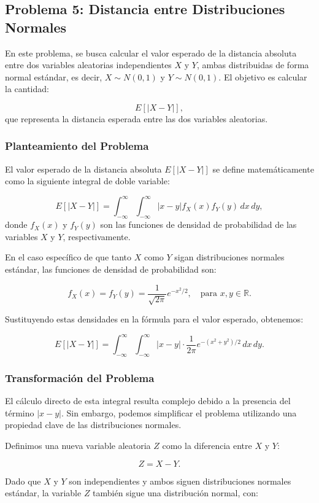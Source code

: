 \documentclass[12pt]{article}
\begin{document}
\subsection{Problema 5: Distancia entre Distribuciones Normales}

En este problema, se busca calcular el valor esperado de la distancia absoluta entre dos variables aleatorias independientes $X$ y $Y$, ambas distribuidas de forma normal estándar, es decir, $X \sim N(0, 1)$ y $Y \sim N(0, 1)$. El objetivo es calcular la cantidad:

\[
E[|X - Y|],
\]
que representa la distancia esperada entre las dos variables aleatorias.

\subsubsection{Planteamiento del Problema}
El valor esperado de la distancia absoluta $E[|X - Y|]$ se define matemáticamente como la siguiente integral de doble variable:

\[
E[|X - Y|] = \int_{-\infty}^\infty \int_{-\infty}^\infty |x - y| f_X(x) f_Y(y) \, dx \, dy,
\]
donde $f_X(x)$ y $f_Y(y)$ son las funciones de densidad de probabilidad de las variables $X$ y $Y$, respectivamente.

En el caso específico de que tanto $X$ como $Y$ sigan distribuciones normales estándar, las funciones de densidad de probabilidad son:

\[
f_X(x) = f_Y(y) = \frac{1}{\sqrt{2\pi}} e^{-x^2/2}, \quad \text{para } x, y \in \mathbb{R}.
\]

Sustituyendo estas densidades en la fórmula para el valor esperado, obtenemos:

\[
E[|X - Y|] = \int_{-\infty}^\infty \int_{-\infty}^\infty |x - y| \cdot \frac{1}{2\pi} e^{-(x^2 + y^2)/2} \, dx \, dy.
\]

\subsubsection{Transformación del Problema}
El cálculo directo de esta integral resulta complejo debido a la presencia del término $|x - y|$. Sin embargo, podemos simplificar el problema utilizando una propiedad clave de las distribuciones normales.

Definimos una nueva variable aleatoria $Z$ como la diferencia entre $X$ y $Y$:

\[
Z = X - Y.
\]

Dado que $X$ y $Y$ son independientes y ambos siguen distribuciones normales estándar, la variable $Z$ también sigue una distribución normal, con:
\end{document}
